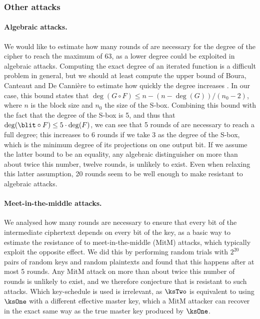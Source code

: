 \subsubsection{Other attacks}

\paragraph{Algebraic attacks.}
We would like to estimate how many rounds of \fly are necessary for the degree of the cipher to reach the maximum of 63, as a lower degree could be exploited in
algebraic attacks. Computing the exact degree of an iterated function is a difficult problem in general,
but we should at least compute the upper bound of Boura, Canteaut and De Cannière
to estimate how quickly the degree increases \cite{permdegree}. In our case, this bound states that $\deg(G \circ F) \leq n - (n - \deg(G))/(n_0 - 2)$, where $n$ is the block size and $n_0$ the
size of the S-box. Combining this bound with the fact that the degree of the S-box is 5, and thus that $\deg(\blit \circ F) \leq 5\cdot\deg(F)$, we can see that 5 rounds of
\fly are necessary to reach a full degree; this increases to 6 rounds if we take 3 as the degree of the S-box, which is the minimum degree of its projections on one
output bit. If we assume the latter bound to be an equality, any algebraic distinguisher on more than about twice this number, \ie twelve rounds, is unlikely to exist.
Even when relaxing this latter assumption, 20 rounds seem to be well enough to make \fly resistant to algebraic attacks.

\paragraph{Meet-in-the-middle attacks.}
We analysed how many rounds are necessary to ensure that every bit of the intermediate ciphertext depends on every bit of the key, as a basic way to estimate the resistance
of \fly to meet-in-the-middle (MitM) attacks, which typically exploit the opposite effect. We did this by performing random trials with $2^{20}$ pairs of random
keys and random plaintexts and found that this happens after at most 5 rounds. Any MitM attack on more than about twice this number of rounds is unlikely to exist, and
we therefore conjecture that \fly is resistant to such attacks. Which key-schedule is used is irrelevant, as $\ksTwo$ is equivalent to
using $\ksOne$ with a different effective master key, which a MitM attacker can recover in the exact same way as the true master key produced by $\ksOne$.

